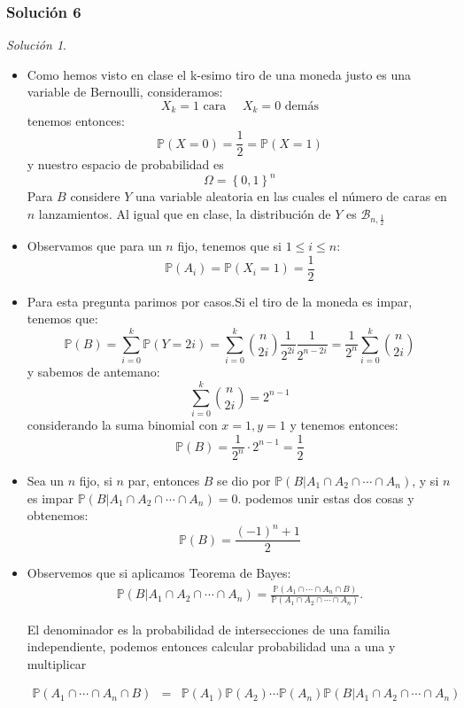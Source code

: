 \documentclass[notitlepage]{article}
\theoremstyle{definition}
\theoremstyle{remark}
\newtheorem*{sol}{Solución}
\newcommand{\prob}[1]{\mathbb{P}(#1)}
\newcommand{\set}[1]{\left\lbrace #1 \right\rbrace}
\newcommand{\PP}{\mathbb{P}}
\begin{document}
	\subsubsection*{Solución 6}
	\begin{sol}
		\begin{itemize}
			\item Como hemos visto en clase el k-esimo tiro de una moneda justo es una variable de Bernoulli, consideramos:
			\[ X_k = 1 \textrm{ cara } \quad X_k = 0 \textrm{ demás}\] 
			tenemos entonces:
			\[ \PP ( X = 0) = \frac{1}{2} = \PP ( X = 1) \]
			y nuestro espacio de probabilidad es \[ \Omega = \set{0,1}^n \]
			Para $ B $ considere $ Y $ una variable aleatoria en las cuales el número de caras en $ n $ lanzamientos. Al igual  que en clase, la distribución de $ Y $ es $ \mathcal{B}_{n,\frac{1}{2}} $
			\item
			Observamos que para un $ n $ fijo, tenemos que si $ 1 \leq i \leq n $:
			\[ \PP ( A_i) = \PP ( X_i = 1) = \frac{1}{2} \]
			\item Para esta pregunta parimos por casos.Si el tiro de la moneda es impar, tenemos que:
			\[ \prob{B}=\sum_{i=0}^k \prob{Y=2i}=\sum_{i=0}^k \binom{n}{2i}\frac{1}{2^{2i}}\frac{1}{2^{n-2i}}= \frac{1}{2^n} \sum_{i=0}^k \binom{n}{2i} \]
			y sabemos de antemano:
			\[ \sum_{i=0}^k \binom{n}{2i} = 2^{n-1} \]
			considerando la suma binomial con $ x = 1, y =1 $
			y tenemos entonces:
			\[ \PP(B) = \frac{1}{2^n} \cdot 2^{n-1} = \frac{1}{2} \]
			\item
			Sea un $ n $ fijo, si $ n $ par, entonces $ B $ se dio por $ \prob{B|A_1 \cap A_2 \cap \cdots \cap A_n}  $, y si $ n $ es impar $ \prob{B|A_1 \cap A_2 \cap \cdots \cap A_n} = 0 $. podemos unir estas dos cosas y obtenemos:
			\[ \prob{B}=\frac{(-1)^n+1}{2}   \]
		
		\item Observemos que si aplicamos Teorema de Bayes:
			\begin{eqnarray}
			\prob{B|A_1 \cap A_2 \cap \cdots \cap A_n}=\frac{\prob{A_1 \cap \cdots \cap A_n \cap B }}{\prob{A_1 \cap A_2 \cap \cdots \cap A_n}}.  \nonumber
			\end{eqnarray}
			
			El denominador es la probabilidad de intersecciones de una familia independiente, podemos entonces calcular probabilidad una a una y multiplicar 
			
			\begin{align*}
			\prob{A_1 \cap \cdots \cap A_n \cap B }&=& \prob{A_1}\prob{A_2}\cdots\prob{A_n}\prob{B|A_1 \cap A_2 \cap \cdots \cap A_n}
			\end{align*}
			

\end{itemize}
\end{sol}
\end{document}

